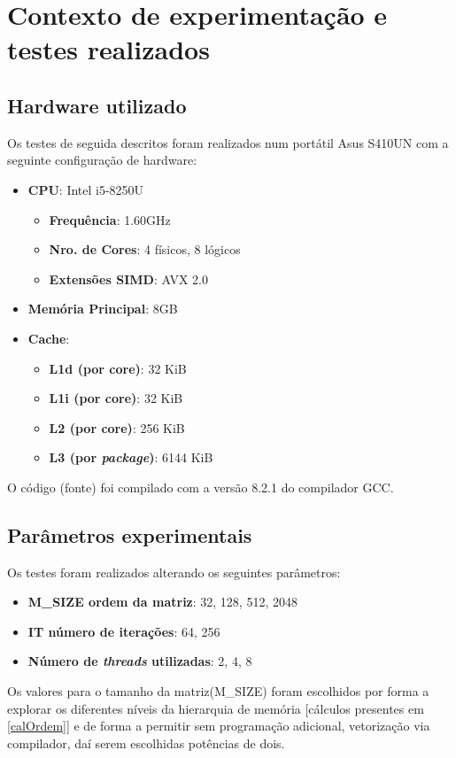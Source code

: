 \documentclass{article}
\begin{document}
\section{Contexto de experimentação e testes realizados} \label{context}
\subsection{Hardware utilizado}
Os testes de seguida descritos foram realizados num portátil Asus S410UN com a seguinte configuração de hardware:
\begin{itemize}
    \item \textbf{CPU}: Intel i5-8250U
        \begin{itemize}
            \item \textbf{Frequência}: 1.60GHz
            \item \textbf{Nro. de Cores}: 4 físicos, 8 lógicos
            \item \textbf{Extensões SIMD}: AVX 2.0
        \end{itemize}
    \item \textbf{Memória Principal}: 8GB
    \item \textbf{Cache}:
        \begin{itemize}
            \item \textbf{L1d (por core)}: 32 KiB
            \item \textbf{L1i (por core)}: 32 KiB
            \item \textbf{L2 (por core)}: 256 KiB
            \item \textbf{L3 (por \textit{package})}: 6144 KiB
        \end{itemize}
\end{itemize}

O código (fonte) foi compilado com a versão 8.2.1 do compilador GCC.

\subsection{Parâmetros experimentais}
Os testes foram realizados alterando os seguintes parâmetros:
\begin{itemize}
    \item \textbf{M\_SIZE ordem da matriz}: 32, 128, 512, 2048
    \item \textbf{IT número de iterações}: 64, 256
    \item \textbf{Número de \textit{threads} utilizadas}: 2, 4, 8
\end{itemize}
Os valores para o tamanho da matriz(M\_SIZE) foram escolhidos por forma a explorar os diferentes níveis da hierarquia 
de memória [cálculos presentes em \ref{calOrdem}] e de forma a permitir sem programação adicional, vetorização via compilador, daí serem escolhidas potências de dois.
\end{document}
